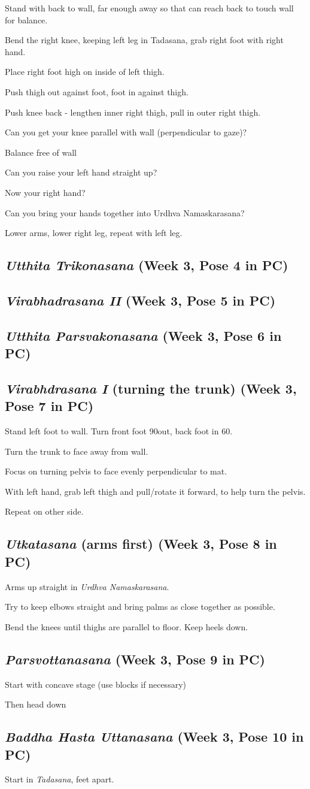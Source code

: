\documentclass{book}
\newcommand{\apose}[1]{\emph{#1}}
\newcommand{\badhastutt}{\apose{Baddha Hasta Uttanasana}}
\newcommand{\parsvo}{\apose{Parsvottanasana}}
\newcommand{\tad}{\apose{Tadasana}}
\newcommand{\urdnam}{\apose{Urdhva Namaskarasana}}
\newcommand{\utka}{\apose{Utkatasana}}
\newcommand{\uttparsva}{\apose{Utthita Parsvakonasana}}
\newcommand{\utttrik}{\apose{Utthita Trikonasana}}
\newcommand{\virai}{\apose{Virabhdrasana I}}
\newcommand{\viraii}{\apose{Virabhadrasana II}}
\newcommand{\PC}[2]{{\normalfont\normalsize \hfill(Week #1, Pose #2 in PC)}}
\newcommand{\newpose}[1]{{{#1}}}
\newcounter{pose}
\newcommand{\pose}{\subsection}
\begin{document}
Stand with back to wall, far enough away so that can reach back to
touch wall for balance.

Bend the right knee, keeping left leg in Tadasana, grab right foot
with right hand.

Place right foot high on inside of left thigh.

Push thigh out against foot, foot in against thigh.

Push knee back - lengthen inner right thigh, pull in outer right
thigh.

Can you get your knee parallel with wall (perpendicular to gaze)?

Balance free of wall

Can you raise your left hand straight up?

Now your right hand?

Can you bring your hands together into Urdhva Namaskarasana?

Lower arms, lower right leg, repeat with left leg.

\pose{\utttrik{} \PC{3}{4}}

\pose{\viraii{} \PC{3}{5}}

\pose{\uttparsva{} \PC{3}{6}}

\pose{\newpose{\virai{}} (turning the trunk) \PC{3}{7}}

Stand left foot to wall. Turn front foot 90\textdegree out, back
foot in 60\textdegree.

Turn the trunk to face away from wall.

Focus on turning pelvis to face evenly perpendicular to mat.

With left hand, grab left thigh and pull/rotate it forward, to
help turn the pelvis.

Repeat on other side.

\pose{\newpose{\utka{}} (arms first) \PC{3}{8}}


Arms up straight in \urdnam{}.

Try to keep elbows straight and bring palms as close together as
possible.

Bend the knees until thighs are parallel to floor. Keep heels
down.

\pose{\parsvo{} \PC{3}{9}}

Start with concave stage (use blocks if necessary)

Then head down

\pose{\newpose{\badhastutt{}} \PC{3}{10}}


Start in \tad{}, feet apart.
\end{document}
